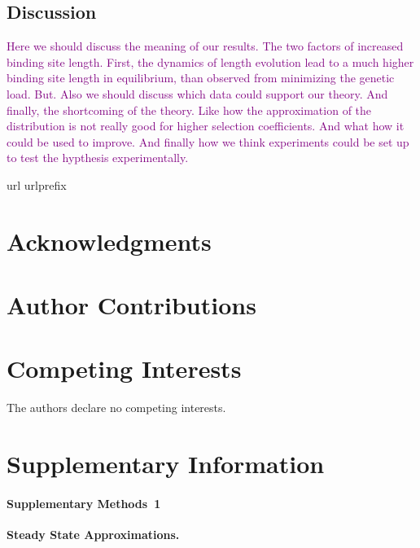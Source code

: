 \documentclass[10pt,a4paper]{article}
\begin{document}
	\subsection*{Discussion}
	\textcolor{purple}{Here we should discuss the meaning of our results. The two factors of increased binding site length. First, the dynamics of length evolution lead to a much higher binding site length in equilibrium, than observed from minimizing the genetic load. But. Also we should discuss which data could support our theory. And finally, the shortcoming of the theory. Like how the approximation of the distribution is not really good for higher selection coefficients. And what how it could be used to improve. And finally how we think experiments could be set up to test the hypthesis experimentally.}



	



\begin{thebibliography}{10}

	\expandafter\ifx\csname url\endcsname\relax
	\def\url#1{\texttt{#1}}\fi
	\expandafter\ifx\csname urlprefix\endcsname\relax\def\urlprefix{URL }\fi
	\providecommand{\bibinfo}[2]{#2}
	\providecommand{\eprint}[2][]{\url{#2}}


	


\end{thebibliography}



\section*{Acknowledgments}



\section*{Author Contributions}


\section*{Competing Interests}
The authors declare no competing interests.


\section*{Supplementary Information}

\paragraph*{Supplementary Methods~1}
\label{supp1}
{\bf Steady State Approximations.}\\
\end{document}
